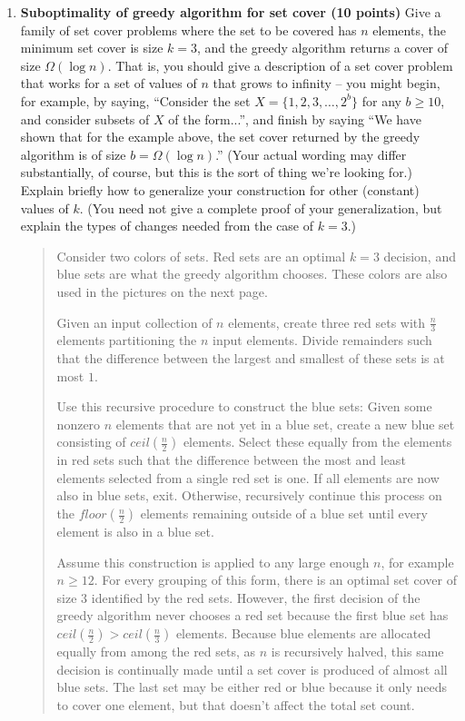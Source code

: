 \documentclass[11pt]{article}
\begin{document}
\begin{enumerate}
\item {\bf Suboptimality of greedy algorithm for set cover (10 points)}
Give a family of set cover problems where the set to be covered
has $n$ elements, the minimum set cover is size $k = 3$, and the
greedy algorithm returns a cover of size $\Omega(\log n)$.  That is,
you should give a description of a set cover problem that works for a
set of values of $n$ that grows to infinity -- you might begin, for
example, by saying, ``Consider the set $X = \{1,2,3,\ldots,2^b\}$ for
any $b \geq 10$, and consider subsets of $X$ of the form...'', and
finish by saying ``We have shown that for the example above, the set
cover returned by the greedy algorithm is of size $b = \Omega(\log
n)$.''  (Your actual wording may differ substantially, of course, but
this is the sort of thing we're looking for.)  Explain briefly how to
generalize your construction for other (constant) values of $k$.  (You
need not give a complete proof of your generalization, but explain the
types of changes needed from the case of $k=3$.)
\begin{quote}
  \color{purple}
Consider two colors of sets. Red sets are an optimal $k = 3$ decision, and blue sets are what the greedy algorithm chooses. These colors are also used in the pictures on the next page.

\medskip
Given an input collection of $n$ elements, create three red sets with $\frac{n}{3}$ elements partitioning the $n$ input elements. Divide remainders such that the difference between the largest and smallest of these sets is at most $1$.

\medskip
Use this recursive procedure to construct the blue sets: Given some nonzero $n$ elements that are not yet in a blue set, create a new blue set consisting of $ceil(\frac{n}{2})$ elements. Select these equally from the elements in red sets such that the difference between the most and least elements selected from a single red set is one. If all elements are now also in blue sets, exit. Otherwise, recursively continue this process on the $floor(\frac{n}{2})$ elements remaining outside of a blue set until every element is also in a blue set.

\medskip
Assume this construction is applied to any large enough $n$, for example $n \geq 12$. For every grouping of this form, there is an optimal set cover of size $3$ identified by the red sets. However, the first decision of the greedy algorithm never chooses a red set because the first blue set has $ceil(\frac{n}{2}) > ceil(\frac{n}{3})$ elements. Because blue elements are allocated equally from among the red sets, as $n$ is recursively halved, this same decision is continually made until a set cover is produced of almost all blue sets. The last set may be either red or blue because it only needs to cover one element, but that doesn't affect the total set count. 


\end{quote}
\end{enumerate}
\end{document}
